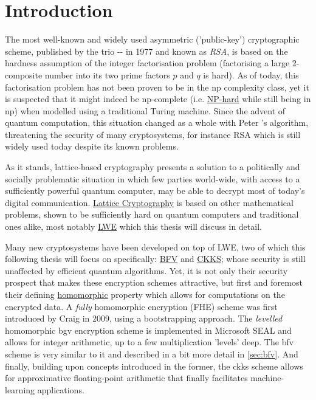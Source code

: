 \chapter{Introduction}
\label{chap:introduction}
The most well-known and widely used asymmetric ('public-key') cryptographic scheme, published by the trio -- in 1977 and known as \textit{RSA}, is based on the hardness assumption of the integer factorisation problem (factorising a large 2-composite number into its two prime factors $p$ and $q$ is hard).
As of today, this factorisation problem has not been proven to be in the \gls{np} complexity class, yet it is suspected that it might indeed be \gls{np}-complete (i.e. \hyperref[def:np-hard]{NP-hard} while still being in \gls{np}) when modelled using a traditional Turing machine.
Since the advent of quantum computation, this situation changed as a whole with Peter 's algorithm, threatening the security of many cryptosystems, for instance RSA which is still widely used today despite its known problems.

As it stands, lattice-based cryptography presents a solution to a politically and socially problematic situation in which few parties world-wide, with access to a sufficiently powerful quantum computer, may be able to decrypt most of today's digital communication.
\hyperref[subsec:lattice-crypto]{Lattice Cryptography} is based on other mathematical problems, shown to be sufficiently hard on quantum computers and traditional ones alike, most notably \hyperref[def:lwe-search-problem]{LWE} which this thesis will discuss in detail.

Many new cryptosystems have been developed on top of LWE, two of which this following thesis will focus on specifically: \hyperref[def:bfv-scheme]{BFV} and \hyperref[def:ckks-scheme]{CKKS};
whose security is still unaffected by efficient quantum algorithms.
Yet, it is not only their security prospect that makes these encryption schemes attractive, but first and foremost their defining \hyperref[def:ring-homomorphism]{homomorphic} property which allows for computations on the encrypted data.
A \textit{fully} homomorphic encryption (FHE) scheme was first introduced by Craig  in 2009, using a bootstrapping approach.
The \textit{levelled} homomorphic \gls{bgv} encryption scheme is implemented in Microsoft SEAL and allows for integer arithmetic, up to a few multiplication 'levels' deep.
The \gls{bfv} scheme is very similar to it and described in a bit more detail in \autoref{sec:bfv}.
And finally, building upon concepts introduced in the former, the \gls{ckks} scheme allows for approximative floating-point arithmetic that finally facilitates machine-learning applications.

